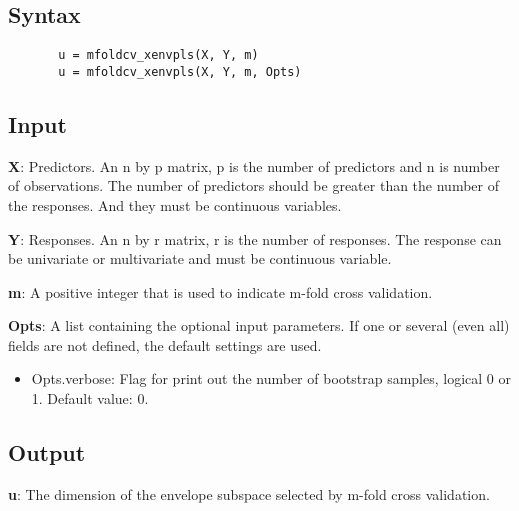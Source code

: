 \documentclass[a4paper,11pt,openany]{memoir}
\begin{document}
\subsection*{Syntax}


\begin{verbatim}       u = mfoldcv_xenvpls(X, Y, m)
       u = mfoldcv_xenvpls(X, Y, m, Opts)\end{verbatim}
    

\subsection*{Input}

\begin{par}
\textbf{X}: Predictors. An n by p matrix, p is the number of predictors and n is number of observations. The number of predictors should be greater than the number of the responses. And they must be continuous variables.
\end{par} \vspace{1em}
\begin{par}
\textbf{Y}: Responses. An n by r matrix, r is the number of responses. The response can be univariate or multivariate and must be continuous variable.
\end{par} \vspace{1em}
\begin{par}
\textbf{m}: A positive integer that is used to indicate m-fold cross validation.
\end{par} \vspace{1em}
\begin{par}
\textbf{Opts}: A list containing the optional input parameters. If one or several (even all) fields are not defined, the default settings are used.
\end{par} \vspace{1em}
\begin{itemize}
\setlength{\itemsep}{-1ex}
   \item Opts.verbose: Flag for print out the number of bootstrap samples, logical 0 or 1. Default value: 0.
\end{itemize}


\subsection*{Output}

\begin{par}
\textbf{u}: The dimension of the envelope subspace selected by m-fold cross validation.
\end{par} \vspace{1em}
    
\end{document}
